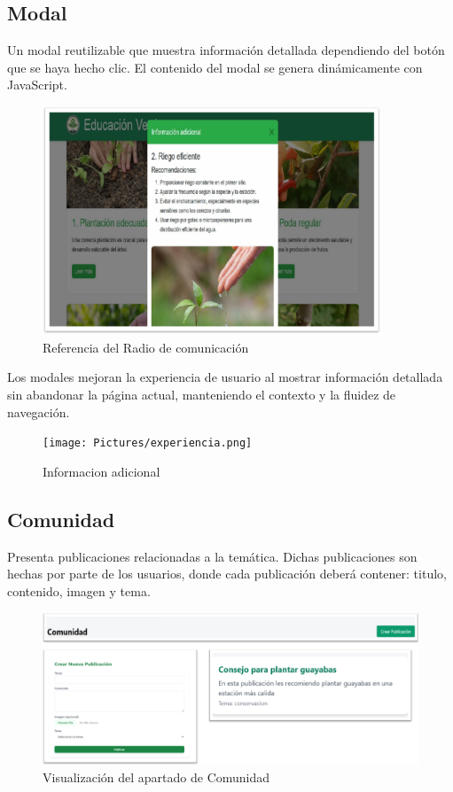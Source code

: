 \documentclass[11pt, a4paper, oneside]{book}
\begin{document}
\subsection {Modal}
Un modal reutilizable que muestra información detallada dependiendo del botón que se haya hecho clic.
El contenido del modal se genera dinámicamente con JavaScript.
\begin{figure}[H]
\centering
\includegraphics[width=0.9\textwidth]{Pictures/modal.png}
\caption{Referencia del Radio de comunicación}
\end{figure}
\vspace{3cm}
Los modales mejoran la experiencia de usuario al mostrar información detallada sin abandonar la página actual, manteniendo el contexto y la fluidez de navegación.
\begin{figure}[H]
\centering
\texttt{[image: Pictures/experiencia.png]}
\caption{Informacion adicional}
\end{figure}

\subsection {Comunidad}
Presenta publicaciones relacionadas a la temática. Dichas publicaciones son hechas por parte de los usuarios, donde cada publicación deberá contener: titulo, contenido, imagen y tema.
\begin{figure}[H]
\centering
\includegraphics[width=1\textwidth]{Pictures/comunidad.png}
\caption{Visualización del apartado de Comunidad}
\end{figure}
\end{document}
